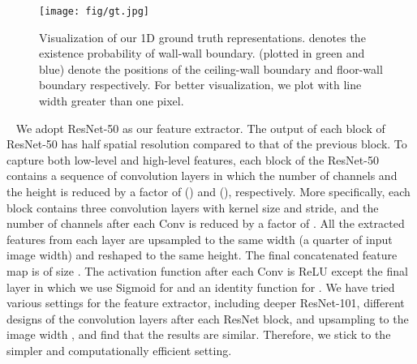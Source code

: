 \documentclass[10pt,twocolumn,letterpaper]{article}
\makeatletter
\renewcommand{\paragraph}{\@startsection{paragraph}{4}{\z@}{0\baselineskip \@plus 0ex \@minus 0ex}{-0em}{\normalfont\normalsize\bfseries}}
\makeatother
\begin{document}
\begin{figure}[h]
   \centering
   \setlength\tabcolsep{1pt}
\texttt{[image: fig/gt.jpg]}
    \caption{Visualization of our 1D ground truth representations.  denotes the existence probability of wall-wall boundary.  (plotted in green and blue) denote the positions of the ceiling-wall boundary and floor-wall boundary respectively. For better visualization, we plot  with line width greater than one pixel.}
    \label{fig:gt}
\end{figure}

\paragraph{Feature Extractor:} ~ We adopt ResNet-50 \cite{HeZRS16} as our feature extractor. The output of each block of ResNet-50 has half spatial resolution compared to that of the previous block. To capture both low-level and high-level features, each block of the ResNet-50 contains a sequence of convolution layers in which the number of channels and the height is reduced by a factor of  () and  (), respectively. More specifically, each block contains three convolution layers with  kernel size and stride, and the number of channels after each Conv is reduced by a factor of . All the extracted features from each layer are upsampled to the same width  (a quarter of input image width) and reshaped to the same height. The final concatenated feature map is of size  . The activation function after each Conv is ReLU except the final layer in which we use Sigmoid for  and an identity function for . We have tried various settings for the feature extractor, including deeper ResNet-101, different designs of the convolution layers after each ResNet block, and upsampling to the image width , and find that the results are similar. Therefore, we stick to the simpler and computationally efficient setting.
\end{document}

